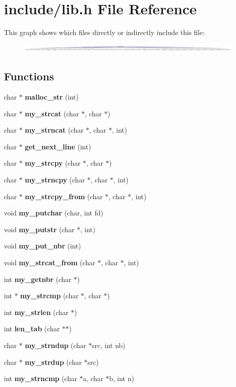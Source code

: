\section{include/lib.h File Reference}
\label{lib_8h}
This graph shows which files directly or indirectly include this file\-:
\nopagebreak
\begin{figure}[H]
\begin{center}
\leavevmode
\includegraphics[width=350pt]{lib_8h__dep__incl}
\end{center}
\end{figure}
\subsection*{Functions}
\begin{DoxyCompactItemize}
\item 
char $\ast$ {\bf malloc\-\_\-str} (int)
\item 
char $\ast$ {\bf my\-\_\-strcat} (char $\ast$, char $\ast$)
\item 
char $\ast$ {\bf my\-\_\-strncat} (char $\ast$, char $\ast$, int)
\item 
char $\ast$ {\bf get\-\_\-next\-\_\-line} (int)
\item 
char $\ast$ {\bf my\-\_\-strcpy} (char $\ast$, char $\ast$)
\item 
char $\ast$ {\bf my\-\_\-strncpy} (char $\ast$, char $\ast$, int)
\item 
char $\ast$ {\bf my\-\_\-strcpy\-\_\-from} (char $\ast$, char $\ast$, int)
\item 
void {\bf my\-\_\-putchar} (char, int fd)
\item 
void {\bf my\-\_\-putstr} (char $\ast$, int)
\item 
void {\bf my\-\_\-put\-\_\-nbr} (int)
\item 
void {\bf my\-\_\-strcat\-\_\-from} (char $\ast$, char $\ast$, int)
\item 
int {\bf my\-\_\-getnbr} (char $\ast$)
\item 
int $\ast$ {\bf my\-\_\-strcmp} (char $\ast$, char $\ast$)
\item 
int {\bf my\-\_\-strlen} (char $\ast$)
\item 
int {\bf len\-\_\-tab} (char $\ast$$\ast$)
\item 
char $\ast$ {\bf my\-\_\-strndup} (char $\ast$src, int nb)
\item 
char $\ast$ {\bf my\-\_\-strdup} (char $\ast$src)
\item 
int {\bf my\-\_\-strncmp} (char $\ast$a, char $\ast$b, int n)
\end{DoxyCompactItemize}


